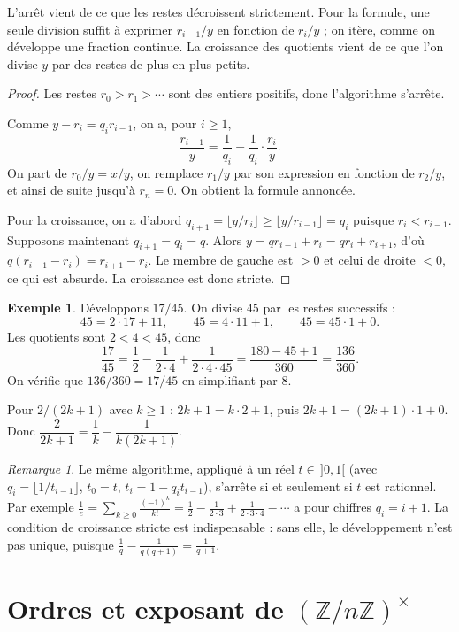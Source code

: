 \documentclass[11pt,a4paper]{article}
\theoremstyle{plain}
\theoremstyle{definition}
\newtheorem{exemple}[theoreme]{Exemple}
\theoremstyle{remark}
\newtheorem{remarque}[theoreme]{Remarque}
\newcommand{\Z}{\mathbb{Z}}
\begin{document}
L'arrêt vient de ce que les restes décroissent strictement. Pour la formule, une seule division suffit à exprimer $r_{i-1}/y$ en fonction de $r_i/y$ ; on itère, comme on développe une fraction continue. La croissance des quotients vient de ce que l'on divise $y$ par des restes de plus en plus petits.

\begin{proof}
Les restes $r_0>r_1>\cdots$ sont des entiers positifs, donc l'algorithme s'arrête.

Comme $y-r_i=q_ir_{i-1}$, on a, pour $i\geq1$,
\[
  \frac{r_{i-1}}{y}=\frac{1}{q_i}-\frac{1}{q_i}\cdot\frac{r_i}{y}.
\]
On part de $r_0/y=x/y$, on remplace $r_1/y$ par son expression en fonction de $r_2/y$, et ainsi de suite jusqu'à $r_n=0$. On obtient la formule annoncée.

Pour la croissance, on a d'abord $q_{i+1}=\lfloor y/r_i\rfloor\geq\lfloor y/r_{i-1}\rfloor=q_i$ puisque $r_i<r_{i-1}$. Supposons maintenant $q_{i+1}=q_i=q$. Alors $y=qr_{i-1}+r_i=qr_i+r_{i+1}$, d'où $q(r_{i-1}-r_i)=r_{i+1}-r_i$. Le membre de gauche est $>0$ et celui de droite $<0$, ce qui est absurde. La croissance est donc stricte.
\end{proof}

\begin{exemple}
Développons $17/45$. On divise $45$ par les restes successifs :
\[
  45=2\cdot17+11,\qquad 45=4\cdot11+1,\qquad 45=45\cdot1+0 .
\]
Les quotients sont $2<4<45$, donc
\[
  \frac{17}{45}=\frac12-\frac1{2\cdot4}+\frac1{2\cdot4\cdot45}
  =\frac{180-45+1}{360}=\frac{136}{360}.
\]
On vérifie que $136/360=17/45$ en simplifiant par $8$.

Pour $2/(2k+1)$ avec $k\geq1$ : $2k+1=k\cdot2+1$, puis $2k+1=(2k+1)\cdot1+0$. Donc $\dfrac{2}{2k+1}=\dfrac1k-\dfrac1{k(2k+1)}$.
\end{exemple}

\begin{remarque}
Le même algorithme, appliqué à un réel $t\in\,]0,1[$ (avec $q_i=\lfloor 1/t_{i-1}\rfloor$, $t_0=t$, $t_i=1-q_it_{i-1}$), s'arrête si et seulement si $t$ est rationnel. Par exemple $\frac1e=\sum_{k\geq0}\frac{(-1)^k}{k!}=\frac12-\frac1{2\cdot3}+\frac1{2\cdot3\cdot4}-\cdots$ a pour chiffres $q_i=i+1$. La condition de croissance stricte est indispensable : sans elle, le développement n'est pas unique, puisque $\frac1q-\frac1{q(q+1)}=\frac1{q+1}$.
\end{remarque}

\section{Ordres et exposant de \texorpdfstring{$(\Z/n\Z)^\times$}{(Z/nZ)*}}
\end{document}
